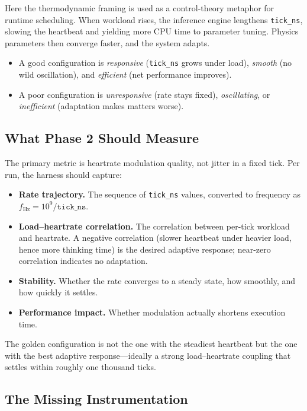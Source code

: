 Here the thermodynamic framing is used as a control-theory metaphor for runtime
scheduling. When workload rises, the inference engine lengthens
\lstinline{tick_ns}, slowing the heartbeat and yielding more CPU time to
parameter tuning. Physics parameters then converge faster, and the system
adapts.

\begin{itemize}
  \item A good configuration is \emph{responsive} (\lstinline{tick_ns} grows
        under load), \emph{smooth} (no wild oscillation), and \emph{efficient}
        (net performance improves).
  \item A poor configuration is \emph{unresponsive} (rate stays fixed),
        \emph{oscillating}, or \emph{inefficient} (adaptation makes matters
        worse).
\end{itemize}

\subsection{What Phase 2 Should Measure}

The primary metric is heartrate modulation quality, not jitter in a fixed tick.
Per run, the harness should capture:

\begin{itemize}
  \item \textbf{Rate trajectory.} The sequence of \lstinline{tick_ns} values,
        converted to frequency as $f_{\text{Hz}} = 10^{9} / \mathtt{tick\_ns}$.
  \item \textbf{Load--heartrate correlation.} The correlation between
        per-tick workload and heartrate. A negative correlation
        (slower heartbeat under heavier load, hence more thinking time) is the
        desired adaptive response; near-zero correlation indicates no
        adaptation.
  \item \textbf{Stability.} Whether the rate converges to a steady state, how
        smoothly, and how quickly it settles.
  \item \textbf{Performance impact.} Whether modulation actually shortens
        execution time.
\end{itemize}

The golden configuration is not the one with the steadiest heartbeat but the
one with the best adaptive response---ideally a strong load--heartrate coupling
that settles within roughly one thousand ticks.

\subsection{The Missing Instrumentation}

